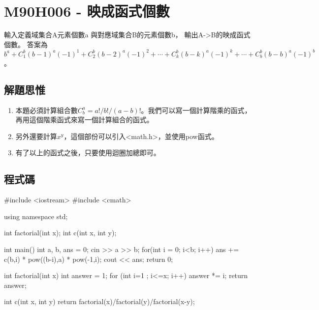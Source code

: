 \section{M90H006 - 映成函式個數}
輸入定義域集合A元素個數a
與對應域集合B的元素個數b，
輸出A->B的映成函式個數。 
答案為 $b^a + C^b_1(b-1)^a(-1)^1+C^b_2(b-2)^a(-1)^2+\cdots
+C^b_k(b-k)^a(-1)^k+\cdots+C^b_b(b-b)^a(-1)^b$。
\subsection{解題思惟}
\begin{enumerate}
	\item 本題必須計算組合數$C^a_b=a!/b!/(a-b)!$。我們可以寫一個計算階乘的函式，再用這個階乘函式來寫一個計算組合的函式。
	\item 另外還要計算$x^y$，這個部份可以引入<math.h>，並使用pow函式。
	\item 有了以上的函式之後，只要使用迴圈加總即可。
\end{enumerate}
\subsection{程式碼}
\begin{cppcode}
#include <iostream>
#include <cmath>

using namespace std;

int factorial(int x);
int c(int x, int y);

int main()
{
	int a, b, ans = 0;
	cin >> a >> b;
	for(int i = 0; i<b; i++) {
		ans += c(b,i) * pow((b-i),a) * pow(-1,i);
	}
	cout << ans;
	return 0;
}

int factorial(int x)
{
	int answer = 1;
	for (int i=1 ; i<=x; i++) answer *= i;
	return answer;
}

int c(int x, int y)
{
	return factorial(x)/factorial(y)/factorial(x-y);
}
\end{cppcode}
